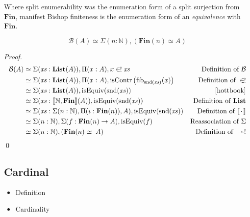 Where split enumerability was the enumeration form of a split surjection from
\(\mathbf{Fin}\), manifest Bishop finiteness is the enumeration form of an
\emph{equivalence} with \(\mathbf{Fin}\).
\begin{romlemma} \label{bishop-equiv}
  \begin{equation}
    \mathcal{B}(A) \simeq \Sigma {(n : \mathbb{N})} , \left( \mathbf{Fin}(n) \simeq A \right)
  \end{equation}
\end{romlemma}
\begin{proof}
  \begin{align*}
    \mathcal{B}(A)
    & \simeq \Sigma (\mathit{xs} : \textbf{List}(A)) , \Pi {(x : A)} , x \inunique \mathit{xs}
    & \text{Definition of } \mathcal{B}
    \\
    & \simeq \Sigma (\mathit{xs} : \textbf{List}(A)) , \Pi {(x : A)} , \text{isContr} \left(\text{fib}_{\text{snd}(\mathit{xs})}(x)\right)
    & \text{Definition of } \inunique
    \\
    & \simeq \Sigma (\mathit{xs} : \textbf{List}(A)) , \text{isEquiv}(\text{snd}(\mathit{xs}))
    & \text{\cite[theorem 4.4.5]{hottbook}}
    \\
    & \simeq \Sigma (\mathit{xs} : \llbracket \mathbb{N} , \mathbf{Fin} \rrbracket (A)) , \text{isEquiv}(\text{snd}(\mathit{xs}))
    & \text{Definition of } \mathbf{List}
    \\
    & \simeq \Sigma (\mathit{xs} : \Sigma (n : \mathbb{N}) , \Pi (i : \mathbf{Fin}(n)) , A) , \text{isEquiv}(\text{snd}(\mathit{xs}))
    & \text{Definition of } \llbracket \wc \rrbracket
    \\
    & \simeq \Sigma (n : \mathbb{N}) , \Sigma (f : \mathbf{Fin}(n) \rightarrow A) , \text{isEquiv}(f)
    & \text{Reassociation of } \Sigma
    \\
    & \simeq \Sigma (n : \mathbb{N}) , ( \mathbf{Fin}(n) \simeq \; A )
    & \text{Definition of } \twoheadrightarrow!
  \end{align*}
  \qed
\end{proof}
\subsection{Cardinal}
\begin{itemize}
\item Definition
\item Cardinality
\end{itemize}
